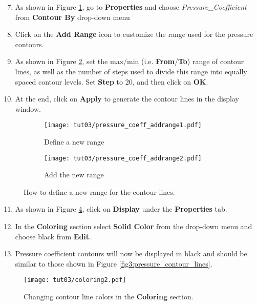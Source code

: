 \begin{enumerate}[label=\arabic*)]
	\setcounter{enumi}{6}
	\item As shown in Figure \ref{fig3:contourby a}, go to \textbf{Properties} and choose \textit{Pressure\_Coefficient} from \textbf{Contour By} drop-down menu
	\item Click on the \textbf{Add Range} icon to customize the range used for the pressure contours.
	\item As shown in Figure \ref{fig3:contourby b}, set the max/min (i.e. \textbf{From}/\textbf{To}) range of contour lines, as well as the number of steps used to divide this range into equally spaced contour levels. Set \textbf{Step} to 20, and then click on \textbf{OK}.
	\item At the end, click on \textbf{Apply} to generate the contour lines in the display window.
\end{enumerate}
\begin{figure}[ht]
    \centering
     \begin{subfigure}[b]{.4\textwidth}
         \centering
         \texttt{[image: tut03/pressure\_coeff\_addrange1.pdf]}
         \caption{Define a new range}
         \label{fig3:contourby a}
     \end{subfigure}
     \hfill
     \begin{subfigure}[b]{.4\textwidth}
         \centering
         \texttt{[image: tut03/pressure\_coeff\_addrange2.pdf]}
         \caption{Add the new range}
         \label{fig3:contourby b}
     \end{subfigure}     
    \caption{How to define a new range for the contour lines.}
    \label{fig3:contourby}
\end{figure}
\begin{enumerate}[label=\arabic*)]
	\setcounter{enumi}{10}
	\item As shown in Figure \ref{fig3:colorby2}, click on \textbf{Display} under the \textbf{Properties} tab.
	\item In the \textbf{Coloring} section select \textbf{Solid Color} from the drop-down menu and choose black from \textbf{Edit}.
	\item Pressure coefficient contours will now be displayed in black and should be similar to those shown in Figure \ref{fig3:pressure_contour_lines}.
\end{enumerate}
\begin{figure}[ht]
    \centering
    \texttt{[image: tut03/coloring2.pdf]}
    \caption{Changing contour line colors in the \textbf{Coloring} section.}
    \label{fig3:colorby2}
\end{figure}
